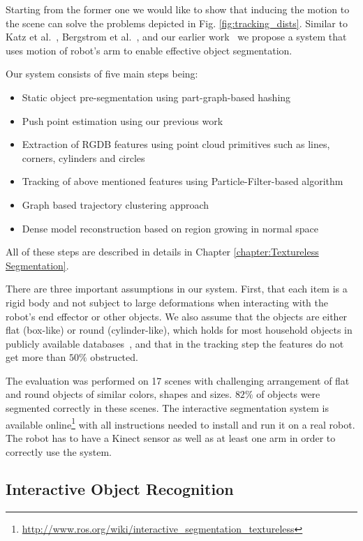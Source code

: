 Starting from the former one we would like to show that inducing the motion to the scene can solve the problems depicted in Fig. \ref{fig:tracking_dists}. Similar  to Katz  et al.~\cite{Katz-WS-MM-ICRA2011}, Bergstrom et
al.~\cite{bergstrom11icvs}, and our earlier
work~\cite{bersch12interactive} we propose a system that uses
motion of robot's arm to enable effective
object  segmentation.

Our system consists of five main steps being:

\begin{itemize} 
\item Static object pre-segmentation using part-graph-based hashing ~\cite{marton12SC}
\item Push point estimation using our previous work ~\cite{bersch12interactive}
\item Extraction of RGDB features using point cloud primitives such as lines, corners, cylinders and circles
\item Tracking of above mentioned features using Particle-Filter-based algorithm
\item Graph based trajectory clustering approach
\item Dense model reconstruction based on region growing in normal space
\end{itemize} 


All of these steps are described in details in Chapter \ref{chapter:Textureless Segmentation}. 


There are three important assumptions in our system. First, that each item is a rigid  body and not subject
to large deformations when  interacting with  the robot's  end  effector or
other objects. We also assume that the objects are either flat (box-like) or round (cylinder-like),
which holds for most household objects in publicly available databases~\cite{marton11ijrr}, and
that in the tracking step the features do not get more than $50\%$ obstructed.

The evaluation was performed on 17 scenes with challenging arrangement of flat and
round objects of similar colors, shapes and sizes. $82\%$ of objects
were segmented correctly in these scenes. The interactive segmentation system is available online\footnote{\url{http://www.ros.org/wiki/interactive_segmentation_textureless}} with all instructions needed to install and run it on a real robot. The robot has to have a Kinect sensor as well as at least one arm in order to correctly use the system.

\subsection{Interactive Object Recognition} 

